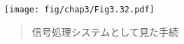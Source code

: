 \begin{figure}[tb]
\label{Figure 3.32}
\centering
\begin{comment}
\heading{Figure 3.32:} The \code{integral} procedure viewed as a signal-processing system.

\begin{example}
                             initial-value
                                  |
       +-----------+              |   |\__
input  |           |      |\__    +-->|   \_  integral
------>| scale: dt +----->|   \_      |cons_>--*------->
       |           |      | add_>---->| __/    |
       +-----------+  +-->| __/       |/       |
                      |   |/                   |
                      |                        |
                      +------------------------+
\end{example}
\end{comment}
\texttt{[image: fig/chap3/Fig3.32.pdf]}
\begin{quote}
 信号処理システムとして見た手続
\end{quote}
\end{figure}

